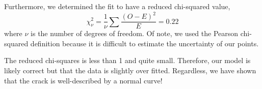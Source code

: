 \documentclass{article}
\begin{document}
Furthermore, we determined the fit to have a reduced chi-squared value,
\begin{equation}
    \chi_\nu^2=\frac{1}{\nu}\sum \frac{(O-E)^2}{E} = 0.22
\end{equation}
where $\nu$ is the number of degrees of freedom. Of note, we used the Pearson chi-squared definition because it is difficult to estimate the uncertainty of our points.

The reduced chi-squares is less than 1 and quite small. Therefore, our model is likely correct but that the data is slightly over fitted. Regardless, we have shown that the crack is well-described by a normal curve!


\nocite{*}
\end{document}
